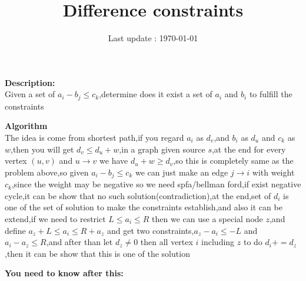 \documentclass{article}
\begin{document}
\title{\textbf{Difference constraints}}
\author{}
\date{Last update : \today}

\maketitle

\noindent \textbf{Description:}\\
Given a set of $a_i-b_j\le c_k$,determine does it exist a set of $a_i$ and $b_i$ to fulfill the constraints

\noindent \textbf{Algorithm}\\
The idea is come from shortest path,if you regard $a_i$ as $d_v$,and $b_i$ as $d_u$ and $c_k$ as $w$,then you will get $d_v\le d_u+w$,in a graph given source $s$,at the end for every vertex $(u,v)$ and $u\rightarrow v$ we have $d_u+w\ge d_v$,so this is completely same as the problem above,so given $a_i-b_j\le c_k$ we can just make an edge $j\rightarrow i$ with weight $c_k$,since the weight may be negative so we need spfa/bellman ford,if exist negative cycle,it can be show that no such solution(contradiction),at the end,set of $d_i$ is one of the set of solution to make the constraints establish,and also it can be extend,if we need to restrict $L\le a_i \le R$ then we can use a special node $z$,and define $a_z+L\le a_i \le R+a_z$  and get two constraints,$a_z-a_i\le -L$ and $a_i-a_z\le R$,and after than let $d_z\ne 0$ then all vertex $i$ including $z$ to do $d_i+=d_z$,then it can be show that this is one of the solution

\noindent \textbf{You need to know after this:}\\
\end{document}
